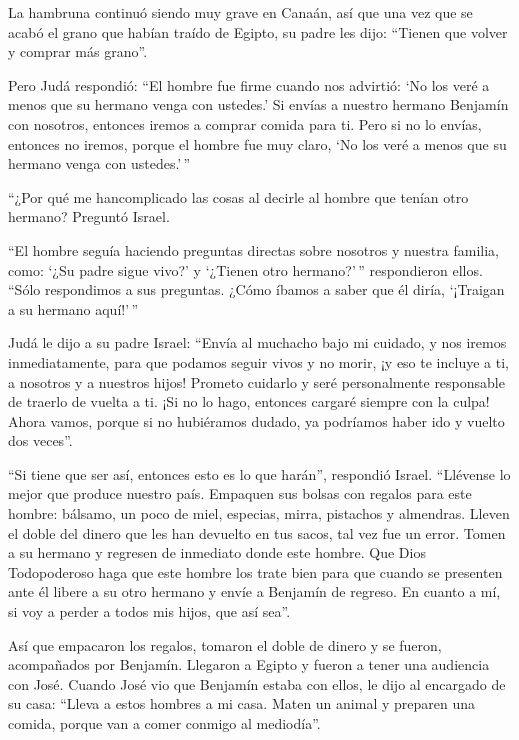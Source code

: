  La hambruna continuó siendo muy grave en Canaán,
 así que una vez que se acabó el grano que habían traído de
Egipto, su padre les dijo: ``Tienen que volver y comprar más grano''.

 Pero Judá respondió: ``El hombre fue firme cuando nos
advirtió: `No los veré a menos que su hermano venga con ustedes.'
 Si envías a nuestro hermano Benjamín con nosotros, entonces
iremos a comprar comida para ti.  Pero si no lo envías,
entonces no iremos, porque el hombre fue muy claro, `No los veré a menos
que su hermano venga con ustedes.'\,''

 ``¿Por qué me hancomplicado las cosas al decirle al hombre
que tenían otro hermano? Preguntó Israel.

 ``El hombre seguía haciendo preguntas directas sobre
nosotros y nuestra familia, como: `¿Su padre sigue vivo?' y `¿Tienen
otro hermano?'\,'' respondieron ellos. ``Sólo respondimos a sus
preguntas. ¿Cómo íbamos a saber que él diría, `¡Traigan a su hermano
aquí!'\,''

 Judá le dijo a su padre Israel: ``Envía al muchacho bajo mi
cuidado, y nos iremos inmediatamente, para que podamos seguir vivos y no
morir, ¡y eso te incluye a ti, a nosotros y a nuestros hijos!
 Prometo cuidarlo y seré personalmente responsable de
traerlo de vuelta a ti. ¡Si no lo hago, entonces cargaré siempre con la
culpa!  Ahora vamos, porque si no hubiéramos dudado, ya
podríamos haber ido y vuelto dos veces''.

 ``Si tiene que ser así, entonces esto es lo que harán'',
respondió Israel. ``Llévense lo mejor que produce nuestro país. Empaquen
sus bolsas con regalos para este hombre: bálsamo, un poco de miel,
especias, mirra, pistachos y almendras.  Lleven el doble
del dinero que les han devuelto en tus sacos, tal vez fue un error.
 Tomen a su hermano y regresen de inmediato donde este
hombre.  Que Dios Todopoderoso haga que este hombre los
trate bien para que cuando se presenten ante él libere a su otro hermano
y envíe a Benjamín de regreso. En cuanto a mí, si voy a perder a todos
mis hijos, que así sea''.

 Así que empacaron los regalos, tomaron el doble de dinero
y se fueron, acompañados por Benjamín. Llegaron a Egipto y fueron a
tener una audiencia con José.  Cuando José vio que Benjamín
estaba con ellos, le dijo al encargado de su casa: ``Lleva a estos
hombres a mi casa. Maten un animal y preparen una comida, porque van a
comer conmigo al mediodía''.

